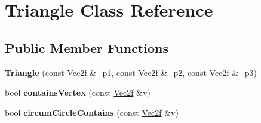 \hypertarget{class_triangle}{}\section{Triangle Class Reference}
\label{class_triangle}
\subsection*{Public Member Functions}
\begin{DoxyCompactItemize}
\item 
{\bfseries Triangle} (const \hyperlink{class_vector2}{Vec2f} \&\+\_\+p1, const \hyperlink{class_vector2}{Vec2f} \&\+\_\+p2, const \hyperlink{class_vector2}{Vec2f} \&\+\_\+p3)\hypertarget{class_triangle_ac91f2225feea061bdc8b90b5ad05ab42}{}\label{class_triangle_ac91f2225feea061bdc8b90b5ad05ab42}

\item 
bool {\bfseries contains\+Vertex} (const \hyperlink{class_vector2}{Vec2f} \&v)\hypertarget{class_triangle_a8b279a0dff36453b04b359dc1c3dfb50}{}\label{class_triangle_a8b279a0dff36453b04b359dc1c3dfb50}

\item 
bool {\bfseries circum\+Circle\+Contains} (const \hyperlink{class_vector2}{Vec2f} \&v)\hypertarget{class_triangle_a7a46dcbaa3532abb09c561ae79a3cc77}{}\label{class_triangle_a7a46dcbaa3532abb09c561ae79a3cc77}

\end{DoxyCompactItemize}
